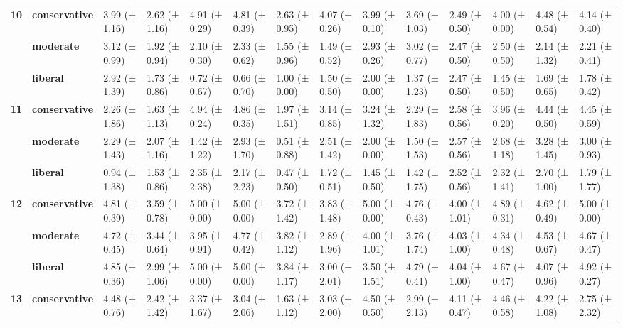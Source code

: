 \begin{longtable}{llllllllllllll}
\cline{1-14}
\multirow[t]{3}{*}{\textbf{10}} & \textbf{conservative} & 3.99 (± 1.16) & 2.62 (± 1.16) & 4.91 (± 0.29) & 4.81 (± 0.39) & 2.63 (± 0.95) & 4.07 (± 0.26) & 3.99 (± 0.10) & 3.69 (± 1.03) & 2.49 (± 0.50) & 4.00 (± 0.00) & 4.48 (± 0.54) & 4.14 (± 0.40) \\
\textbf{} & \textbf{moderate} & 3.12 (± 0.99) & 1.92 (± 0.94) & 2.10 (± 0.30) & 2.33 (± 0.62) & 1.55 (± 0.96) & 1.49 (± 0.52) & 2.93 (± 0.26) & 3.02 (± 0.77) & 2.47 (± 0.50) & 2.50 (± 0.50) & 2.14 (± 1.32) & 2.21 (± 0.41) \\
\textbf{} & \textbf{liberal} & 2.92 (± 1.39) & 1.73 (± 0.86) & 0.72 (± 0.67) & 0.66 (± 0.70) & 1.00 (± 0.00) & 1.50 (± 0.50) & 2.00 (± 0.00) & 1.37 (± 1.23) & 2.47 (± 0.50) & 1.45 (± 0.50) & 1.69 (± 0.65) & 1.78 (± 0.42) \\
\cline{1-14}
\multirow[t]{3}{*}{\textbf{11}} & \textbf{conservative} & 2.26 (± 1.86) & 1.63 (± 1.13) & 4.94 (± 0.24) & 4.86 (± 0.35) & 1.97 (± 1.51) & 3.14 (± 0.85) & 3.24 (± 1.32) & 2.29 (± 1.83) & 2.58 (± 0.56) & 3.96 (± 0.20) & 4.44 (± 0.50) & 4.45 (± 0.59) \\
\textbf{} & \textbf{moderate} & 2.29 (± 1.43) & 2.07 (± 1.16) & 1.42 (± 1.22) & 2.93 (± 1.70) & 0.51 (± 0.88) & 2.51 (± 1.42) & 2.00 (± 0.00) & 1.50 (± 1.53) & 2.57 (± 0.56) & 2.68 (± 1.18) & 3.28 (± 1.45) & 3.00 (± 0.93) \\
\textbf{} & \textbf{liberal} & 0.94 (± 1.38) & 1.53 (± 0.86) & 2.35 (± 2.38) & 2.17 (± 2.23) & 0.47 (± 0.50) & 1.72 (± 0.51) & 1.45 (± 0.50) & 1.42 (± 1.75) & 2.52 (± 0.56) & 2.32 (± 1.41) & 2.70 (± 1.00) & 1.79 (± 1.77) \\
\cline{1-14}
\multirow[t]{3}{*}{\textbf{12}} & \textbf{conservative} & 4.81 (± 0.39) & 3.59 (± 0.78) & 5.00 (± 0.00) & 5.00 (± 0.00) & 3.72 (± 1.42) & 3.83 (± 1.48) & 5.00 (± 0.00) & 4.76 (± 0.43) & 4.00 (± 1.01) & 4.89 (± 0.31) & 4.62 (± 0.49) & 5.00 (± 0.00) \\
\textbf{} & \textbf{moderate} & 4.72 (± 0.45) & 3.44 (± 0.64) & 3.95 (± 0.91) & 4.77 (± 0.42) & 3.82 (± 1.12) & 2.89 (± 1.96) & 4.00 (± 1.01) & 3.76 (± 1.74) & 4.03 (± 1.00) & 4.34 (± 0.48) & 4.53 (± 0.67) & 4.67 (± 0.47) \\
\textbf{} & \textbf{liberal} & 4.85 (± 0.36) & 2.99 (± 1.06) & 5.00 (± 0.00) & 5.00 (± 0.00) & 3.84 (± 1.17) & 3.00 (± 2.01) & 3.50 (± 1.51) & 4.79 (± 0.41) & 4.04 (± 1.00) & 4.67 (± 0.47) & 4.07 (± 0.96) & 4.92 (± 0.27) \\
\cline{1-14}
\multirow[t]{3}{*}{\textbf{13}} & \textbf{conservative} & 4.48 (± 0.76) & 2.42 (± 1.42) & 3.37 (± 1.67) & 3.04 (± 2.06) & 1.63 (± 1.12) & 3.03 (± 2.00) & 4.50 (± 0.50) & 2.99 (± 2.13) & 4.11 (± 0.47) & 4.46 (± 0.58) & 4.22 (± 1.08) & 2.75 (± 2.32) \\

\end{longtable}

